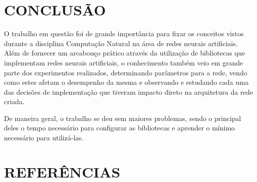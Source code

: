 \documentclass[12pt]{article}
\begin{document}
\section{CONCLUSÃO}

O trabalho em questão foi de grande importância para fixar os conceitos vistos
durante a disciplina Computação Natural na área de redes neurais artificiais.
Além de fornecer um arcabouço prático através da utilização de bibliotecas
que implementam redes neurais artificiais, o conhecimento também veio em
grande parte dos experimentos realizados, determinando parâmetros para a
rede, vendo como estes afetam o desempenho da mesma e observando e estudando
cada uma das decisões de implementação que tiveram impacto direto na
arquitetura da rede criada.

De maneira geral, o trabalho se deu sem maiores problemas, sendo o principal
deles o tempo necessário para configurar as bibliotecas e aprender o mínimo
necessário para utilizá-las.

\section{REFERÊNCIAS}



\end{document}
